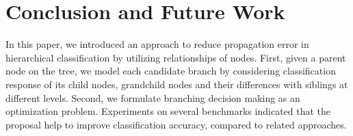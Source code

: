 \documentclass[review]{elsarticle}
\begin{document}
 
\section{Conclusion and Future Work}  \label{sec:conclusion}
In this paper, we introduced an approach to reduce propagation error in hierarchical classification by utilizing relationships of nodes. First, given a parent node on the tree, we model each candidate branch by considering classification response of its child nodes, grandchild nodes and their differences with siblings at different levels. Second, we formulate branching decision making as an optimization problem. Experiments on several benchmarks indicated that the proposal help to improve classification accuracy, compared to related approaches.




%

%










\end{document}
